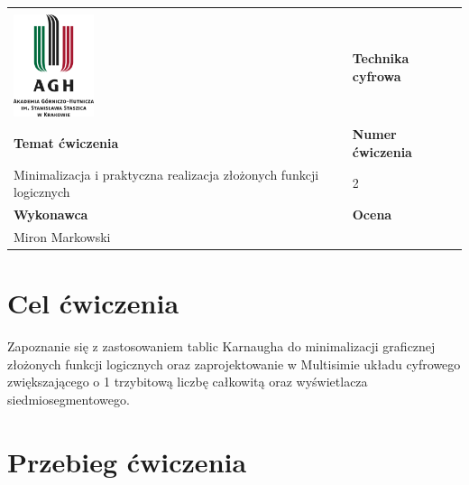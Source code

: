 \documentclass[12pt,a4paper]{article}
\begin{document}
\begin{table}[]
\label{my-label}
\begin{tabular}{|p{7.5cm}|p{7.5cm}|}
\hline
									           					&                           \\
\includegraphics[height=3cm]{logo}             					& \textbf{Technika cyfrowa} \\ \hline
\multicolumn{1}{|l|}{\textbf{Temat ćwiczenia}} 					& \textbf{Numer ćwiczenia}  \\
\multicolumn{1}{|l|}{Minimalizacja i praktyczna realizacja złożonych funkcji logicznych}	& 2                         \\ \hline
\multicolumn{1}{|l|}{\textbf{Wykonawca}}       & \textbf{Ocena}            \\
\multicolumn{1}{|l|}{Miron Markowski}          &                           \\ \hline
\end{tabular}
\end{table}

\section{Cel ćwiczenia}


Zapoznanie się z zastosowaniem tablic Karnaugha do minimalizacji graficznej złożonych funkcji logicznych oraz zaprojektowanie w Multisimie układu cyfrowego zwiększającego o 1 trzybitową liczbę całkowitą oraz wyświetlacza siedmiosegmentowego.

\section{Przebieg ćwiczenia}
\end{document}

